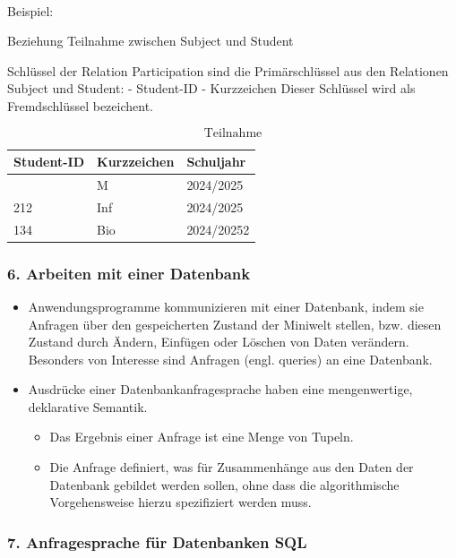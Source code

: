 \documentclass[
  11pt,
  a4paper,
  DIV=11,
  numbers=noendperiod]{scrartcl}
\makeatletter
\let\oldparagraph\paragraph
\renewcommand{\paragraph}{
    \@ifstar
      \xxxParagraphStar
      \xxxParagraphNoStar
  }
\newcommand{\xxxParagraphStar}[1]{\oldparagraph*{#1}\mbox{}}
\newcommand{\xxxParagraphNoStar}[1]{\oldparagraph{#1}\mbox{}}
\providecommand{\tightlist}{%
  \setlength{\itemsep}{0pt}\setlength{\parskip}{0pt}}\usepackage{longtable,booktabs,array}
\makeatother
\begin{document}
\paragraph{Beispiel:}\label{beispiel}

Beziehung Teilnahme zwischen Subject und Student

Schlüssel der Relation Participation sind die Primärschlüssel aus den
Relationen Subject und Student: - Student-ID - Kurzzeichen Dieser
Schlüssel wird als Fremdschlüssel bezeichent.

\[ \text{Teilnahme} \]

\begin{longtable}[]{@{}lll@{}}
\toprule\noalign{}
Student-ID & Kurzzeichen & Schuljahr \\
\midrule\noalign{}
\endhead
\bottomrule\noalign{}
\endlastfoot
212 & M & 2024/2025 \\
212 & Inf & 2024/2025 \\
134 & Bio & 2024/20252 \\
\end{longtable}

\subsubsection{6. Arbeiten mit einer
Datenbank}\label{arbeiten-mit-einer-datenbank}

\begin{itemize}
\item
  Anwendungsprogramme kommunizieren mit einer Datenbank, indem sie
  Anfragen über den gespeicherten Zustand der Miniwelt stellen, bzw.
  diesen Zustand durch Ändern, Einfügen oder Löschen von Daten
  verändern. Besonders von Interesse sind Anfragen (engl. queries) an
  eine Datenbank.
\item
  Ausdrücke einer Datenbankanfragesprache haben eine mengenwertige,
  deklarative Semantik.

  \begin{itemize}
  \tightlist
  \item
    Das Ergebnis einer Anfrage ist eine Menge von Tupeln.
  \item
    Die Anfrage definiert, was für Zusammenhänge aus den Daten der
    Datenbank gebildet werden sollen, ohne dass die algorithmische
    Vorgehensweise hierzu spezifiziert werden muss.
  \end{itemize}
\end{itemize}

\subsubsection{7. Anfragesprache für Datenbanken
SQL}\label{anfragesprache-fuxfcr-datenbanken-sql}
\end{document}
